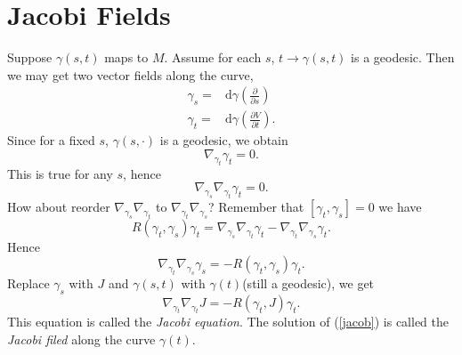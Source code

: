 \section{Jacobi Fields}
Suppose $\gamma(s,t)$ maps to $M$. Assume for each $s$, $t\to \gamma(s,t)$ is a geodesic. Then we may get two vector fields along the curve,
\begin{align*}
  \gamma_s=&\mathrm{d}\gamma\left( \frac{\partial}{\partial s} \right) \\
  \gamma_t = & \mathrm{d}\gamma\left( \frac{\partial V}{\partial t}  \right) 
.\end{align*}
Since for a fixed  $s$, $\gamma(s,\cdot )$ is a geodesic, we obtain 
\[
\nabla _{\gamma_t}\gamma_t=0.
\] 
This is true for any  $s$, hence 
 \[
\nabla _{\gamma_s}\nabla _{\gamma_t}\gamma_t=0
.\]
How about reorder $\nabla _{\gamma_s}\nabla _{\gamma_t}$ to $\nabla _{\gamma_t}\nabla _{\gamma_s}$? Remember that $[\gamma_t,\gamma_s]=0$ we have 
\[
  R(\gamma_t,\gamma_s)\gamma_t = \nabla _{\gamma_s}\nabla _{\gamma_t}\gamma_t-\nabla _{\gamma_t}\nabla _{\gamma_s}\gamma_t.
\] 
Hence 
\[
  \nabla _{\gamma_t}\nabla _{\gamma_s}\gamma_s=-R\left( \gamma_t,\gamma_s \right) \gamma_t.
\] 
Replace $\gamma_s$ with $J$ and $\gamma(s,t)$ with $\gamma(t)$(still a geodesic), we get 
\begin{equation}
  \nabla_{\gamma_t}\nabla _{\gamma_t}J=-R(\gamma_t, J)\gamma_t.\label{jacob}
\end{equation}
This equation is called the \textit{Jacobi equation}.
The solution of (\ref{jacob}) is called the \textit{Jacobi filed} along the curve $\gamma(t)$.

